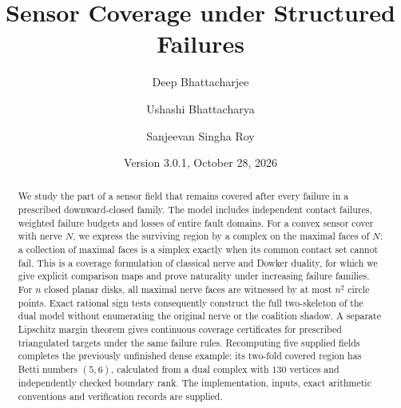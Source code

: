 \documentclass[11pt,reqno]{amsart}
\title[Sensor coverage under structured failures]{Sensor Coverage under Structured Failures}
\author{Deep Bhattacharjee}
\author{Ushashi Bhattacharya}
\author{Sanjeevan Singha Roy}
\date{Version 3.0.1, October 28, 2026}
\theoremstyle{definition}
\theoremstyle{remark}
\begin{document}
\begin{abstract}
We study the part of a sensor field that remains covered after every failure in a prescribed downward-closed family. The model includes independent contact failures, weighted failure budgets and losses of entire fault domains. For a convex sensor cover with nerve $N$, we express the surviving region by a complex on the maximal faces of $N$: a collection of maximal faces is a simplex exactly when its common contact set cannot fail. This is a coverage formulation of classical nerve and Dowker duality, for which we give explicit comparison maps and prove naturality under increasing failure families. For $n$ closed planar disks, all maximal nerve faces are witnessed by at most $n^2$ circle points. Exact rational sign tests consequently construct the full two-skeleton of the dual model without enumerating the original nerve or the coalition shadow. A separate Lipschitz margin theorem gives continuous coverage certificates for prescribed triangulated targets under the same failure rules. Recomputing five supplied fields completes the previously unfinished dense example: its two-fold covered region has Betti numbers $(5,6)$, calculated from a dual complex with $130$ vertices and independently checked boundary rank. The implementation, inputs, exact arithmetic conventions and verification records are supplied.
\end{abstract}
\maketitle
\tableofcontents








\end{document}
